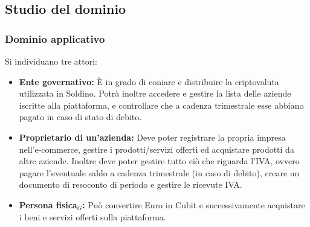 \subsection{Studio del dominio}
\subsubsection{Dominio applicativo}
Si individuano tre attori:
\begin{itemize}	
	\item \textbf{Ente governativo: }\`E in grado di coniare e distribuire la 
	criptovaluta utilizzata in Soldino. Potrà inoltre accedere e gestire la lista 
delle aziende iscritte alla piattaforma, e controllare che a cadenza trimestrale 
esse abbiano pagato in caso di stato di debito.
	\item \textbf{Proprietario di un'azienda:} Deve poter registrare la propria 
impresa nell'e-commerce, gestire i prodotti/servizi offerti ed acquistare 
prodotti da altre aziende. Inoltre deve poter gestire tutto ciò che riguarda 
l'IVA, ovvero pagare l'eventuale saldo a cadenza trimestrale (in caso di 
debito), creare un documento di resoconto di periodo e gestire le ricevute IVA.
	\item \textbf{Persona fisica$_{G}$: }Può convertire Euro in Cubit e 
successivamente acquistare i beni e servizi offerti sulla piattaforma. 
\end{itemize}
